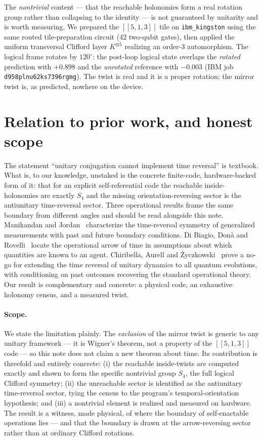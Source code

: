 \documentclass[11pt]{article}
\newcommand{\Sfour}{S_4}
\newcommand{\code}{[[5,1,3]]}
\begin{document}
The \emph{nontrivial} content --- that the reachable holonomies form a real
rotation group rather than collapsing to the identity --- is not guaranteed by
unitarity and is worth measuring. We prepared the $\code$ tile on
\texttt{ibm\_kingston} using the same routed tile-preparation circuit (42
two-qubit gates), then applied the uniform transversal Clifford layer
$K^{\otimes 5}$ realizing an order-$3$ automorphism. The logical frame rotates by
$120^\circ$: the post-loop logical state overlaps the
\emph{rotated} prediction with $+0.898$ and the \emph{unrotated} reference with
$-0.003$ (IBM job \texttt{d958plnu62ks7396rgmg}). The twist is real and it is a
proper rotation; the mirror twist is, as predicted, nowhere on the device.

\section{Relation to prior work, and honest scope}

The statement ``unitary conjugation cannot implement time reversal'' is textbook.
What is, to our knowledge, unstaked is the concrete finite-code, hardware-backed
form of it: that for an explicit self-referential code the reachable
inside-holonomies are exactly $\Sfour$ and the missing orientation-reversing
sector is the antiunitary time-reversal sector. Three operational results frame
the same boundary from different angles and
should be read alongside this note. Manikandan and Jordan~\cite{manikandan}
characterize the time-reversal symmetry of generalized measurements with past and
future boundary conditions. Di Biagio, Don\`a and Rovelli~\cite{dibiagio} locate
the operational arrow of time in assumptions about which quantities are known to
an agent. Chiribella, Aurell and \.Zyczkowski~\cite{chiribella} prove a no-go for
extending the time reversal of unitary dynamics to all quantum evolutions, with
conditioning on past outcomes recovering the standard operational theory. Our
result is complementary and concrete: a physical code, an exhaustive holonomy
census, and a measured twist.

\paragraph{Scope.} We state the limitation plainly. The \emph{exclusion} of the
mirror twist is generic to any unitary framework --- it is Wigner's theorem, not
a property of the $\code$ code --- so this note does not claim a new theorem about
time. Its contribution is threefold and entirely concrete: (i) the reachable
inside-twists are computed exactly and shown to form the specific nontrivial group
$\Sfour$, the full logical Clifford symmetry; (ii) the unreachable sector is
identified as the antiunitary time-reversal sector, tying the census to the
program's temporal-orientation hypothesis; and (iii) a nontrivial element is
realized and measured on hardware. The result is a witness, made physical, of
where the boundary of self-enactable operations lies --- and that the boundary is
drawn at the arrow-reversing sector rather than at ordinary Clifford rotations.
\end{document}
